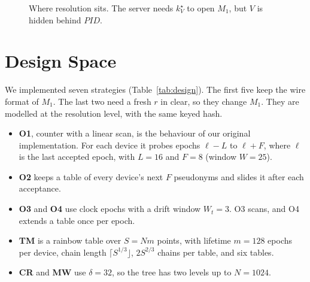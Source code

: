 \begin{figure}[t]
\centering
{}
\caption{Where resolution sits. The server needs $k^\star_V$ to open $M_1$, but $V$ is hidden behind $PID$.}
\label{fig:flow}
\end{figure}

\section{Design Space}\label{sec:design}
We implemented seven strategies (Table~\ref{tab:design}). The first five keep the wire format of $M_1$. The last two need
a fresh $r$ in clear, so they change $M_1$. They are modelled at the resolution level, with the same keyed hash.
\begin{itemize}
\item \textbf{O1}, counter with a linear scan, is the behaviour of our original implementation. For each device it probes
epochs $\ell-L$ to $\ell+F$, where $\ell$ is the last accepted epoch, with $L=16$ and $F=8$ (window $W=25$).
\item \textbf{O2} keeps a table of every device's next $F$ pseudonyms and slides it after each acceptance.
\item \textbf{O3} and \textbf{O4} use clock epochs with a drift window $W_t=3$. O3 scans, and O4 extends a table once per
epoch.
\item \textbf{TM} is a rainbow table over $S=Nm$ points, with lifetime $m=128$ epochs per device, chain length
$\lceil S^{1/3}\rfloor$, $2S^{2/3}$ chains per table, and six tables.
\item \textbf{CR} and \textbf{MW} use $\delta=32$, so the tree has two levels up to $N=1024$.
\end{itemize}


